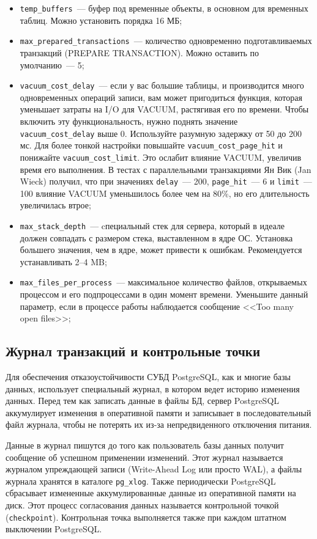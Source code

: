 \begin{itemize}
  \item \lstinline!temp_buffers!~--- буфер под временные объекты, в основном для временных таблиц. Можно установить порядка 16 МБ;
  \item \lstinline!max_prepared_transactions!~--- количество одновременно подготавливаемых транзакций (PREPARE TRANSACTION). Можно оставить по умолчанию~--- 5;
  \item \lstinline!vacuum_cost_delay!~--- если у вас большие таблицы, и производится много одновременных операций записи, вам может пригодиться функция, которая уменьшает затраты на I/O для VACUUM, растягивая его по времени. Чтобы включить эту функциональность, нужно поднять значение \lstinline!vacuum_cost_delay! выше 0. Используйте разумную задержку от 50 до 200 мс. Для более тонкой настройки повышайте \lstinline!vacuum_cost_page_hit! и понижайте \lstinline!vacuum_cost_limit!. Это ослабит влияние VACUUM, увеличив время его выполнения. В тестах с параллельными транзакциями Ян Вик (Jan Wieck) получил, что при значениях \lstinline!delay!~--- 200, \lstinline!page_hit!~--- 6 и \lstinline!limit!~---100 влияние VACUUM уменьшилось более чем на 80\%, но его длительность увеличилась втрое;
  \item \lstinline!max_stack_depth!~--- cпециальный стек для сервера, который в идеале должен совпадать с размером стека, выставленном в ядре ОС. Установка большего значения, чем в ядре, может привести к ошибкам. Рекомендуется устанавливать 2--4 MB;
  \item \lstinline!max_files_per_process!~--- максимальное количество файлов, открываемых процессом и его подпроцессами в один момент времени. Уменьшите данный параметр, если в процессе работы наблюдается сообщение <<Too many open files>>;
\end{itemize}


\subsection{Журнал транзакций и контрольные точки}


Для обеспечения отказоустойчивости СУБД PostgreSQL, как и многие базы данных, использует специальный журнал, в котором ведет историю изменения данных. Перед тем как записать данные в файлы БД, сервер PostgreSQL аккумулирует изменения в оперативной памяти и записывает в последовательный файл журнала, чтобы не потерять их из-за непредвиденного отключения питания.

Данные в журнал пишутся до того как пользователь базы данных получит сообщение об успешном применении изменений. Этот журнал называется журналом упреждающей записи (Write-Ahead Log или просто WAL), а файлы журнала хранятся в каталоге \lstinline!pg_xlog!. Также периодически PostgreSQL сбрасывает измененные аккумулированные данные из оперативной памяти на диск. Этот процесс согласования данных называется контрольной точкой (\lstinline!checkpoint!). Контрольная точка выполняется также при каждом штатном выключении PostgreSQL.

